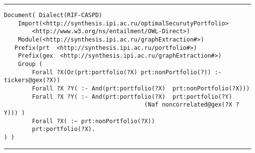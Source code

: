 \hrule
{\small

  \begin{verbatim}
Document( Dialect(RIF-CASPD)
    Import(<http://synthesis.ipi.ac.ru/optimalSecurutyPortfolio>
        <http://www.w3.org/ns/entailment/OWL-Direct>)
    Module(<http://synthesis.ipi.ac.ru/graphExtraction#>)
   Prefix(prt  <http://synthesis.ipi.ac.ru/portfolio#>)
    Prefix(gex  <http://synthesis.ipi.ac.ru/graphExtraction#>)
    Group (
        Forall ?X(Or(prt:portfolio(?X) prt:nonPortfolio(?)) :- tickers@gex(?X))
        Forall ?X ?Y( :- And(prt:portfolio(?X)  prt:nonPortfolio(?X)))
        Forall ?X ?Y( :- And(prt:portfolio(?X)  prt:portfolio(?Y)
                                        (Naf noncorrelated@gex(?X ?Y))) )
        Forall ?X( :~ prt:nonPortfolio(?X))
        prt:portfolio(?X).
) )
\end{verbatim}

}

\hrule


